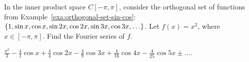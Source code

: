 \begin{ex}
  In the inner product space $C[-\pi,\pi]$, consider the orthogonal
  set of functions from Example~\ref{exa:orthogonal-set-sin-cos}:
  $\left\{1, \sin x, \cos x, \sin 2x, \cos 2x, \sin 3x, \cos 3x, \ldots\right\}$.  Let
  $f(x) = x^2$, where $x\in[-\pi,\pi]$. Find the Fourier series of
  $f$.
  \begin{sol}
    $\frac{\pi^2}{3} - \frac{4}{1}\cos x + \frac{4}{4}\cos 2x - \frac{4}{9} \cos 3x + \frac{4}{16} \cos 4x - \frac{4}{25} \cos 5x \pm \ldots$.
  \end{sol}
\end{ex}
